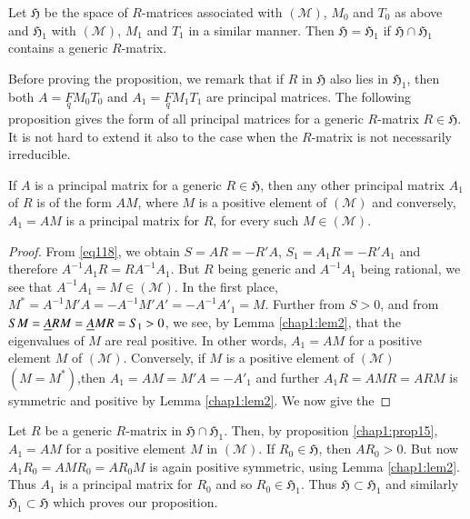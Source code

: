\begin{proposition}\label{chap1:prop14}
Let $\mathfrak{H}$ be the space of $R$-matrices associated with
$(\mathscr{M})$, $M_{0}$ and $T_{0}$ as above and $\mathfrak{H}_{1}$
with $(\mathscr{M})$, $M_{1}$ and $T_{1}$ in a similar manner. Then
$\mathfrak{H}=\mathfrak{H}_{1}$ if $\mathfrak{H}\cap \mathfrak{H}_{1}$
contains a generic $R$-matrix.
\end{proposition}

Before proving the proposition, we remark that if $R$ in
$\mathfrak{H}$ also lies in $\mathfrak{H}_{1}$, then both
$A=\underset{q}{F}M_{0}T_{0}$ and $A_{1}=\underset{q}{F}M_{1}T_{1}$
are principal matrices. The following proposition gives the form of
all principal matrices for a generic $R$-matrix $R\in\mathfrak{H}$. It
is not hard to extend it also to the case when the $R$-matrix is not
necessarily irreducible.

\begin{proposition}\label{chap1:prop15}
If $A$ is a principal matrix for a generic $R\in\mathfrak{H}$, then
any other principal matrix $A_{1}$ of $R$ is of the form $AM$, where
$M$ is a positive element of $(\mathscr{M})$ and conversely,
$A_{1}=AM$ is a principal matrix for $R$, for every such $M\in(\mathscr{M})$.
\end{proposition}

\begin{proof}
From \eqref{eq118}, we obtain $S=AR=-R'A$, $S_{1}=A_{1}R=-R'A_{1}$ and
therefore $A^{-1}A_{1}R=RA^{-1}A_{1}$. But $R$ being generic and
$A^{-1}A_{1}$ being rational, we see that
$A^{-1}A_{1}=M\in(\mathscr{M})$. In the first place,
$M^{\ast}=A^{-1}M'A=-A^{-1}M'A'=-A^{-1}A'_{1}=M$. Further from $S>0$,
and from $SM=\underline{A}RM=\underline{A}MR=S_{1}>0$, we see, by Lemma \ref{chap1:lem2},
that the eigenvalues of $M$ are real positive. In other words,
$A_{1}=AM$ for a positive element $M$ of $(\mathscr{M})$. Conversely,
if $M$ is a positive element of $(\mathscr{M})$
$(M=M^{\ast})$,\pageoriginale then $A_{1}=AM=M'A=-A'_{1}$ and further
$A_{1}R=AMR=ARM$ is symmetric and positive by Lemma \ref{chap1:lem2}. We now
give the
\end{proof}

\setcounter{prfofprop}{13}
\begin{prfofprop}\label{proofofprop14}
Let $R$ be a generic $R$-matrix in $\mathfrak{H}\cap
\mathfrak{H}_{1}$. Then, by proposition \ref{chap1:prop15}, $A_{1}=AM$ for a
positive element $M$ in $(\mathscr{M})$. If $R_{0}\in\mathfrak{H}$,
then $AR_{0}>0$. But now $A_{1}R_{0}=AMR_{0}=AR_{0}M$ is again
positive symmetric, using Lemma \ref{chap1:lem2}. Thus $A_{1}$ is a
principal matrix for $R_{0}$ and so $R_{0}\in\mathfrak{H}_{1}$. Thus
$\mathfrak{H}\subset \mathfrak{H}_{1}$ and similarly
$\mathfrak{H}_{1}\subset \mathfrak{H}$ which proves our proposition.
\end{prfofprop}

